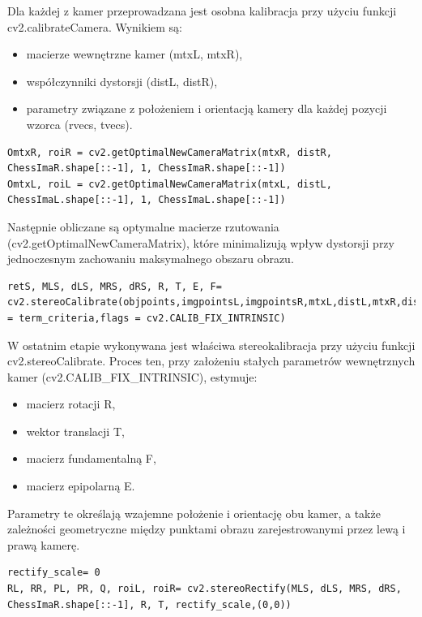 \documentclass[magisterska]{pracadypl}
\begin{document}
Dla każdej z kamer przeprowadzana jest osobna kalibracja przy użyciu funkcji cv2.calibrateCamera. Wynikiem są:

\begin{itemize}
    \item macierze wewnętrzne kamer (mtxL, mtxR),
    \item współczynniki dystorsji (distL, distR),
    \item parametry związane z położeniem i orientacją kamery dla każdej pozycji wzorca (rvecs, tvecs).
\end{itemize}

\begin{lstlisting}[style=mypython]
OmtxR, roiR = cv2.getOptimalNewCameraMatrix(mtxR, distR, ChessImaR.shape[::-1], 1, ChessImaR.shape[::-1])
OmtxL, roiL = cv2.getOptimalNewCameraMatrix(mtxL, distL, ChessImaL.shape[::-1], 1, ChessImaL.shape[::-1])
\end{lstlisting}

Następnie obliczane są optymalne macierze rzutowania (cv2.getOptimalNewCameraMatrix), które minimalizują wpływ dystorsji przy jednoczesnym zachowaniu maksymalnego obszaru obrazu.

\begin{lstlisting}[style=mypython]
retS, MLS, dLS, MRS, dRS, R, T, E, F= cv2.stereoCalibrate(objpoints,imgpointsL,imgpointsR,mtxL,distL,mtxR,distR,ChessImaR.shape[::-1],criteria = term_criteria,flags = cv2.CALIB_FIX_INTRINSIC)
\end{lstlisting}

W ostatnim etapie wykonywana jest właściwa stereokalibracja przy użyciu funkcji cv2.stereoCalibrate.
Proces ten, przy założeniu stałych parametrów wewnętrznych kamer (cv2.CALIB\_FIX\_INTRINSIC), estymuje:

\begin{itemize}
    \item macierz rotacji R,
    \item wektor translacji T,
    \item macierz fundamentalną F,
    \item macierz epipolarną E.
\end{itemize}

Parametry te określają wzajemne położenie i orientację obu kamer, a także zależności geometryczne między punktami obrazu zarejestrowanymi przez lewą i prawą kamerę.

\begin{lstlisting}[style=mypython]
rectify_scale= 0 
RL, RR, PL, PR, Q, roiL, roiR= cv2.stereoRectify(MLS, dLS, MRS, dRS, ChessImaR.shape[::-1], R, T, rectify_scale,(0,0))  
\end{lstlisting}
\end{document}

